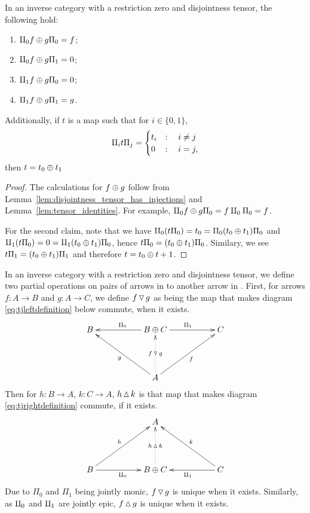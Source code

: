 \begin{corollary}\label{cor:split_plus_tensor}
  In an inverse category \X with a restriction zero and disjointness tensor, the following hold:
  \begin{multicols}{2}
    \begin{enumerate}[{(}i{)}]
      \item $\amalg_{0} f \oplus g \Pi_0 = f$;
      \item $\amalg_{0} f\oplus g \Pi_1 = 0$;
      \item $\amalg_{1} f \oplus g \Pi_0 = 0$;
      \item $\amalg_{1} f\oplus g \Pi_1 = g$.
    \end{enumerate}
  \end{multicols}
  Additionally, if $t$ is a map such that for $i \in \{0,1\}$,
  \[
    \amalg_{i} t \Pi_j =
    \begin{cases}
      t_i& : \quad i \neq j\\
      0 & : \quad i = j,
    \end{cases}
  \]
  then $t = t_0 \oplus t_1$
\end{corollary}
\begin{proof}
  The calculations for $f\oplus g$ follow from Lemma~\ref{lem:disjointness_tensor_has_injections} and
  Lemma~\ref{lem:tensor_identities}. For example, $\amalg_{0} f\oplus g \Pi_0 = f \amalg_{0} \Pi_0 = f$.

  For the second claim, note that we have $\amalg_{0} (t \Pi_0) = t_0 = \amalg_{0} ( t_0 \oplus t_1)\Pi_0$ and
  $\amalg_{1}  (t \Pi_0) = 0 = \amalg_{1} ( t_0 \oplus t_1)\Pi_0$, hence $t \Pi_0 = ( t_0 \oplus t_1)\Pi_0$. Similary,
  we see $t\Pi_1 = ( t_0 \oplus t_1)\Pi_1$ and therefore $t = t_0 \oplus t+1$.
\end{proof}
\begin{definition}\label{def:up_triangle_and_down_triangle}
  In an inverse category \X with a restriction zero and disjointness tensor, we define two partial
  operations on pairs of arrows in \X to another arrow in \X. First, for arrows
  $f:A \to B$ and $g:A \to C$, we define $f\operatorname{\triangledown} g$ as
  being the map that makes diagram \eqref{eq:tjleftdefinition} below commute, when it exists.
  \begin{equation}
    \xymatrix@C+0pt @R+20pt{
      B&&B\+C \ar[ll]_{\Pi_0} \ar[rr]^{\Pi_1} && C\\
      &&A \ar[ull]^{g} \ar[urr]_{f} \ar@{.>}[u]|-{f\tjleft g}
      }\label{eq:tjleftdefinition}
  \end{equation}
  Then for $h:B \to A$, $k: C \to A$, $h\operatorname{\vartriangle} k$ is that map that makes diagram
  \eqref{eq:tjrightdefinition} commute, if it exists.
  \begin{equation}
    \xymatrix@C+0pt @R+20pt{
      &&A\\
      B\ar[rr]_{\cpa} \ar[urr]^{h} &&B\+C   \ar@{.>}[u]|-{h\tjright k}
        && C \ar[ll]^{\cpb} \ar[ull]_{k}
      }\label{eq:tjrightdefinition}
  \end{equation}
  Due to $\Pi_0$ and $\Pi_1$ being jointly monic, $f\operatorname{\triangledown} g$ is unique when it exists.
  Similarly, as $\amalg_{0}$ and $\amalg_{1}$ are jointly epic, $f\operatorname{\vartriangle} g$ is unique when it exists.
\end{definition}

